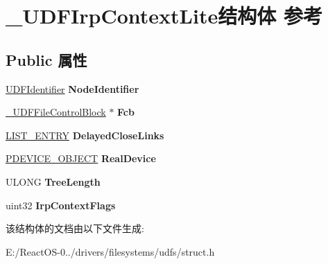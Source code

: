 \hypertarget{struct___u_d_f_irp_context_lite}{}\section{\+\_\+\+U\+D\+F\+Irp\+Context\+Lite结构体 参考}
\label{struct___u_d_f_irp_context_lite}
\subsection*{Public 属性}
\begin{DoxyCompactItemize}
\item 
\mbox{\label{struct___u_d_f_irp_context_lite_a38ba2c1d28cf61a9ee7765fae264d59a}} 
\hyperlink{struct___u_d_f_identifier}{U\+D\+F\+Identifier} {\bfseries Node\+Identifier}
\item 
\mbox{\label{struct___u_d_f_irp_context_lite_a364c6d4577317e0f2469f309c6245593}} 
\hyperlink{struct___u_d_f_file_control_block}{\+\_\+\+U\+D\+F\+File\+Control\+Block} $\ast$ {\bfseries Fcb}
\item 
\mbox{\label{struct___u_d_f_irp_context_lite_a2a56ed9dfb9ebd1529aab7020487344d}} 
\hyperlink{struct___l_i_s_t___e_n_t_r_y}{L\+I\+S\+T\+\_\+\+E\+N\+T\+RY} {\bfseries Delayed\+Close\+Links}
\item 
\mbox{\label{struct___u_d_f_irp_context_lite_a2fda662ebebe4b9b19f314559817c7b5}} 
\hyperlink{struct___d_e_v_i_c_e___o_b_j_e_c_t}{P\+D\+E\+V\+I\+C\+E\+\_\+\+O\+B\+J\+E\+CT} {\bfseries Real\+Device}
\item 
\mbox{\label{struct___u_d_f_irp_context_lite_ac70aff4ba438ce2737c13725bb0a9732}} 
U\+L\+O\+NG {\bfseries Tree\+Length}
\item 
\mbox{\label{struct___u_d_f_irp_context_lite_a4020bf541a420a9bf4fad976bf13fbce}} 
uint32 {\bfseries Irp\+Context\+Flags}
\end{DoxyCompactItemize}


该结构体的文档由以下文件生成\+:\begin{DoxyCompactItemize}
\item 
E\+:/\+React\+O\+S-\/0../drivers/filesystems/udfs/struct.\+h\end{DoxyCompactItemize}

